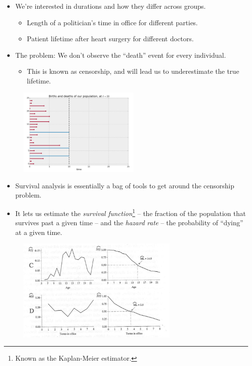 \documentclass{beamer}
\begin{document}
\begin{frame}
	\begin{itemize}
		\item We're interested in durations and how they differ across groups.
			\begin{itemize}
				\item Length of a politician's time in office for different parties.
				\item Patient lifetime after heart surgery for different doctors.
			\end{itemize}
		\item The problem: We don't observe the ``death'' event for every individual.
			\begin{itemize}
				\item This is known as censorship, and will lead us to underestimate the true lifetime.
			\end{itemize}
	\end{itemize}
	\begin{figure}
		\includegraphics[width=6cm]{lifelines-censorship.png}
		\centering
	\end{figure}
\end{frame}

\begin{frame}
	\begin{itemize}
		\item Survival analysis is essentially a bag of tools to get around the censorship problem.
		\item It lets us estimate the \textit{survival function}\footnote{Known as the Kaplan-Meier estimator.} -- the fraction of the population that survives past a given time -- and the \textit{hazard rate} -- the probability of ``dying'' at a given time.
	\end{itemize}
	\begin{figure}
		\includegraphics[width=8cm]{singer-survivalhazard.png}
		\centering
	\end{figure}
\end{frame}
\end{document}
